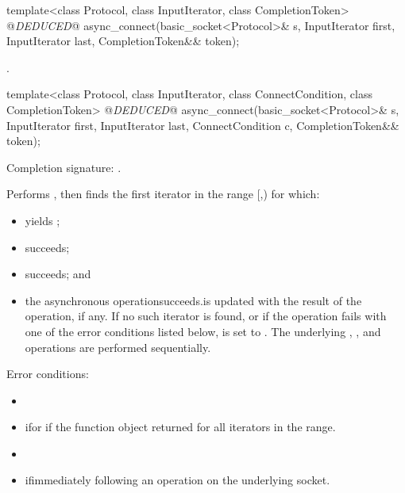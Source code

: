 \begin{itemdecl}
template<class Protocol, class InputIterator, class CompletionToken>
  @\textit{DEDUCED}@ async_connect(basic_socket<Protocol>& s,
                        InputIterator first, InputIterator last,
                        CompletionToken&& token);
\end{itemdecl}

\begin{itemdescr}
\pnum
\returns {}.
\end{itemdescr}

\begin{itemdecl}
template<class Protocol, class InputIterator,
  class ConnectCondition, class CompletionToken>
    @\textit{DEDUCED}@ async_connect(basic_socket<Protocol>& s,
                          InputIterator first, InputIterator last,
                          ConnectCondition c,
                          CompletionToken&& token);
\end{itemdecl}

\begin{itemdescr}
\pnum
Completion signature: .

\pnum
\effects Performs , then finds the first iterator  in the range [,) for which:
\begin{itemize}
\item
{}yields ;
\item
{}succeeds;
\item
{}succeeds; and
\item
 the asynchronous operationsucceeds.is updated with the result of the operation, if any. If no such iterator is found, or if the operation fails with one of the error conditions listed below, is set to . \enternote The underlying , , and  operations are performed sequentially. \exitnote
\end{itemize}

\pnum
Error conditions: 
\begin{itemize}
\item
{}
\item
 ifor if the function object returned for all iterators in the range.
\item
{}
\item
 ifimmediately following an  operation on the underlying socket.
\end{itemize}
\end{itemdescr}



